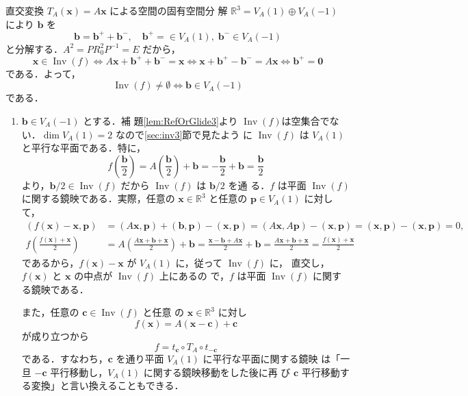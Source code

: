 \documentclass[11pt, uplatex, dvipdfmx, titlepage]{jsarticle}
\makeatletter
\DeclareMathOperator{\Inv}{Inv}
\renewenvironment{proof}[1][\proofname]{\par
  \pushQED{\qed}%
  \normalfont \topsep6\p@\@plus6\p@\relax
  \trivlist
  \item[\hskip\labelsep
         \bfseries
    {#1}]\ignorespaces
}{%
  \popQED\endtrivlist\@endpefalse
}
\theoremstyle{definition}
\renewcommand{\proofname}{\textbf{証明}}
\makeatother
\begin{document}
\begin{proof}
  直交変換 $T_A(\bm{x}) = A\bm{x}$ による空間の固有空間分
  解 $\mathbb{R}^3 = V_A(1) \oplus V_A(-1)$ により $\bm{b}$ を
\[
  \bm{b} = \bm{b}^{+} + \bm{b}^{-}, \quad \bm{b}^{+} =  \in V_A(1), \; \bm{b}^{-}  \in V_A(-1)
\]
と分解する．$A^2= PR_0^2P^{-1}=E$ だから，
\[
  \bm{x} \in \Inv(f) \Leftrightarrow A\bm{x} + \bm{b}^{+}+ \bm{b}^{-} = \bm{x} \Leftrightarrow
  \bm{x} + \bm{b}^{+}-\bm{b}^{-}=A\bm{x} \Leftrightarrow
  \bm{b}^{+} = \bm{0}
\]
である．よって，
\[
  \Inv(f) \neq \emptyset \Leftrightarrow \bm{b} \in V_A(-1)
\]
である．
\end{proof}

\begin{proof}[定理\ref{thm:RefOrGlide3}の証明]
  
  \begin{enumerate}[(1)]
  \item $\bm{b} \in V_A(-1)$ とする．補
    題\ref{lem:RefOrGlide3}より $\Inv(f)$は空集合でない．$\dim
    V_A(1)=2$ なので\ref{sec:inv3}節で見たよう
    に $\Inv(f)$ は $V_A(1)$ と平行な平面である．特に，
    \[
      f\left(\frac{\bm{b}}{2}\right) = A\left(\frac{\bm{b}}{2}\right)
      + \bm{b} = -\frac{\bm{b}}{2} + \bm{b} = \frac{\bm{b}}{2}
    \]
    より，$\bm{b}/2 \in \Inv(f)$ だから $\Inv(f)$ は $\bm{b}/2$ を通
    る．$f$ は平面 $\Inv(f)$ に関する鏡映である．実際，任意の $\bm{x}
    \in \mathbb{R}^3$ と任意の $\bm{p} \in V_A(1)$ に対して，
    \begin{align*}
      \left(f(\bm{x})-\bm{x}, \bm{p}\right) &= (A\bm{x}, \bm{p}) + (\bm{b},\bm{p}) - (\bm{x},\bm{p})
      =(A\bm{x}, A\bm{p}) - (\bm{x}, \bm{p}) = (\bm{x}, \bm{p}) - (\bm{x}, \bm{p}) =0,\\
      f\left(\frac{f(\bm{x})+\bm{x}}{2}\right) &= A\left( \frac{A\bm{x}+\bm{b}+\bm{x}}{2}\right)+\bm{b}
      = \frac{\bm{x}-\bm{b}+A\bm{x}}{2} + \bm{b} 
      = \frac{A\bm{x}+\bm{b}+\bm{x}}{2} = \frac{f(\bm{x})+\bm{x}}{2}
    \end{align*}
    であるから，$f(\bm{x})-\bm{x}$ が $V_A(1)$ に，従って $\Inv(f)$ に，
    直交し，$f(\bm{x})$ と $\bm{x}$ の中点が $\Inv(f)$ 上にあるの
    で，$f$ は平面 $\Inv(f)$ に関する鏡映である．



    また，任意の $\bm{c} \in \Inv(f)$ と任意
    の $\bm{x} \in \mathbb{R}^3$ に対し
    \[
      f(\bm{x}) = A(\bm{x}-\bm{c}) + \bm{c}
    \]
    が成り立つから
    \[
      f=t_{\bm{c}} \circ T_A \circ t_{-\bm{c}}
    \]
    である．すなわち，$\bm{c}$ を通り平面 $V_A(1)$ に平行な平面に関する鏡映
    は「一旦 $-\bm{c}$ 平行移動し，$V_A(1)$ に関する鏡映移動をした後に再
    び $\bm{c}$ 平行移動する変換」と言い換えることもできる．


\end{enumerate}
\end{proof}
\end{document}
